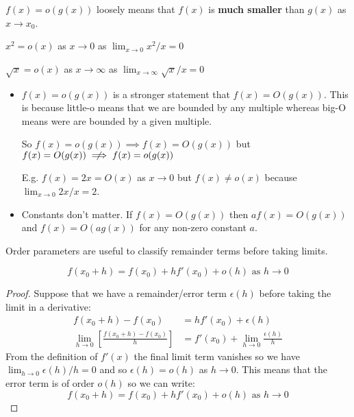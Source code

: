 \documentclass[../main.tex]{subfiles}
\begin{document}
$f(x) = o(g(x))$ loosely means that $f(x)$ is \textbf{much smaller} than $g(x)$ as $x \to x_0$. 
\begin{example}
 $x^2 = o(x)$ as $x \to 0$ as $\lim_{x \to 0} x^2/x = 0$
\end{example}
\begin{example}
  $\sqrt{x} = o(x)$ as $x \to \infty$ as $\lim_{x \to \infty} \sqrt{x}/x = 0$
\end{example}
\begin{remark}[Notes]
  \begin{itemize}
    \item $f(x) = o(g(x))$ is a stronger statement that $f(x) = O(g(x))$. 
      This is because little-o means that we are bounded by any multiple whereas big-O means were are bounded by a given multiple.

      So $f(x) = o(g(x)) \implies f(x) = O(g(x))$ but $f(x) = O(g(x)) \centernot\implies f(x) = o(g(x))$

      E.g. $f(x) = 2x = O(x)$ as $x \to 0$ but $f(x) \neq o(x)$ because $\lim_{x \to 0} 2x/x = 2$.
    \item Constants don't matter. If $f(x) = O(g(x))$ then $af(x) = O(g(x))$ and $f(x) = O(ag(x))$ for any non-zero constant $a$.
  \end{itemize} 
\end{remark}
Order parameters are useful to classify remainder terms before taking limits.
\begin{proposition}
  \[
    f(x_0 + h) = f(x_0) + hf'(x_0) + o(h) \text{ as } h\to0
  \]
\end{proposition}
\begin{proof}
  Suppose that we have a remainder/error term $\epsilon(h)$ before taking the limit in a derivative:
  \begin{align*}
    f(x_0 + h) - f(x_0) &= hf'(x_0) + \epsilon(h) \\
    \lim_{h \to 0} \left[\frac{f(x_0 + h) - f(x_0)}{h}\right] &= f'(x_0) + \lim_{h \to 0} \frac{\epsilon(h)}{h}
  \end{align*}
  From the definition of $f'(x)$ the final limit term vanishes so we have $\lim_{h \to 0} \epsilon(h)/h = 0$ and so $\epsilon(h) = o(h)$ as $h\to0$.
  This means that the error term is of order $o(h)$ so we can write:
  \[
    f(x_0 + h) = f(x_0) + hf'(x_0) + o(h) \text{ as } h\to0
  \]
\end{proof}
\end{document}

